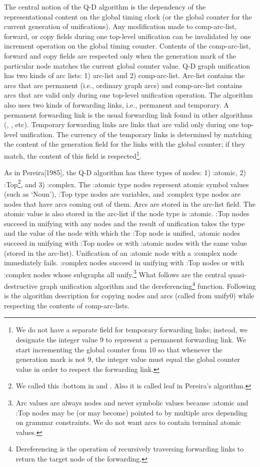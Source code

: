 The central notion of the Q-D algorithm is the dependency of the
representational content on the global timing clock (or the
global counter for the current generation of unifications).
Any modification made to comp-arc-list, forward, or copy fields
during one top-level unification
can be invalidated by one increment operation on the global timing
counter. Contents of the comp-arc-list, forward and copy fields
are respected only when the generation mark of the
particular node matches the current global counter value.
 Q-D graph unification has two kinds of arc lists: 1) arc-list and
2) comp-arc-list. Arc-list contains the arcs that are permanent
(i.e., ordinary graph arcs) and comp-arc-list contains arcs
that are valid only during one top-level unification operation.
The algorithm also uses two kinds of forwarding links, i.e., permanent
and temporary. A permanent forwarding link is the usual
forwarding link found in other algorithms (\cite{Pereira},
\cite{Wroblewski}, etc).  Temporary forwarding links are
links that are valid only during one top-level unification. 
The currency of the temporary links is determined by
matching the content of the generation field for the links
with the global counter; if they match, the content of this
field is respected\footnote{We do not have a separate field
for temporary forwarding links; instead, we designate the
integer value 9 to represent a permanent forwarding link. We
start incrementing the global counter from 10 so that
whenever the generation mark is not 9, the integer value
must equal the global counter value in order to respect the
forwarding link.}. 

 As in Pereira[1985], the Q-D algorithm has three types of
nodes: 1) :atomic, 2) :Top\footnote{We called this :bottom
in \cite{quasi} and \cite{quasi-str}. Also it is called leaf
in Pereira's algorithm.}, and 3) :complex. The :atomic type
nodes represent atomic symbol values (such as `Noun'), :Top
type nodes are variables, and :complex type nodes are nodes
that have arcs coming out of them. Arcs are stored in the
arc-list field.  The atomic value is also stored in the
arc-list if the node type is :atomic.  :Top nodes succeed in
unifying with any nodes and the result of unification takes
the type and the value of the node with which the :Top node
is unified, :atomic nodes succeed in unifying with :Top
nodes or with :atomic nodes with the same value (stored in
the arc-list).  Unification of an :atomic node with a
:complex node immediately fails. :complex nodes succeed in
unifying with :Top nodes or with :complex nodes whose
subgraphs all unify.\footnote{Arc values are always nodes
and never symbolic values because :atomic and :Top nodes may
be (or may become) pointed to by multiple arcs depending on
grammar constraints. We do not want arcs to contain terminal
atomic values.} What follows are the central
quasi-destructive graph unification algorithm and the
dereferencing\footnote{Dereferencing is the operation of
recursively traversing forwarding links to return the target
node of the forwarding.}
function. Following is the algorithm description for
copying nodes and arcs (called from unify0) while respecting
the contents of comp-arc-lists.



